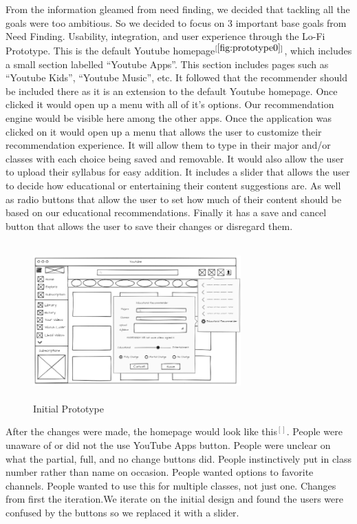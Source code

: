 \documentclass[letterpaper]{article} %
\begin{document}
From the information gleamed from need finding, we decided that tackling all the goals were too ambitious. So we decided to focus on 3 important base goals from Need Finding. Usability, integration, and user experience through the Lo-Fi Prototype. This is the default Youtube homepage$^{[\ref{fig:prototype0}]}$, which includes a small section labelled “Youtube Apps”. This section includes pages such as “Youtube Kids”, “Youtube Music”, etc. It followed that the recommender should be included there as it is an extension to the default Youtube homepage. Once clicked it would open up a menu with all of it’s options. Our recommendation engine would be visible here among the other apps. Once the application was clicked on it would open up a menu that allows the user to customize their recommendation experience. It will allow them to type in their major and/or classes with each choice being saved and removable. It would also allow the user to upload their syllabus for easy addition. It includes a slider that allows the user to decide how educational or entertaining their content suggestions are. As well as radio buttons that allow the user to set how much of their content should be based on our educational recommendations. Finally it has a save and cancel button that allows the user to save their changes or disregard them.

\begin{figure}[h]     
	\centering
    \includegraphics[width=8cm, height=6cm]{prototype0.PNG}
    \caption{Initial Prototype}
    \label{fig:prototype0}
\end{figure}

 After the changes were made, the homepage would look like this$^[]$. People were unaware of or did not the use YouTube Apps button. People were unclear on what the partial, full, and no change buttons did. People instinctively put in class number rather than name on occasion. People wanted options to favorite channels. People wanted to use this for multiple classes, not just one. Changes from first the iteration.We iterate on the initial design and found the users were confused by the buttons so we replaced it with a slider. 
\end{document}
